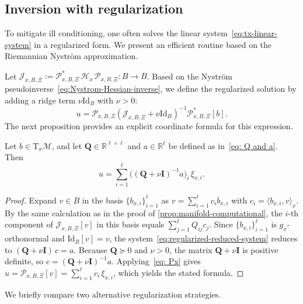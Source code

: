 \documentclass[final,onefignum,onetabnum]{siamart250211}
\begin{document}
\subsection{Inversion with regularization}
\label{subsec:regularized-riem-linear-systems}
To mitigate ill conditioning, one often solves the linear system~\eqref{eq:tx-linear-system} in a regularized form. We present an efficient routine based on the Riemannian Nystr\"om approximation.

Let $\mathcal J_{x,B,\Xi}:=\mathcal{P}_{x,B,\Xi}^{*}\,\mathcal{H}_x\,\mathcal{P}_{x,B,\Xi}:B\to B$.
Based on the Nystr\"om pseudoinverse~\eqref{eq:Nystrom-Hessian-inverse}, we define the regularized solution by adding a ridge term $\nu\mathrm{Id}_B$ with $\nu > 0$:
\begin{equation}
\label{eq:regularized-reduced-system}
u = \mathcal{P}_{x,B,\Xi} (\mathcal J_{x,B,\Xi} + \nu \mathrm{Id}_B)^{-1} \mathcal{P}_{x,B,\Xi}^{*} [b].
\end{equation}
The next proposition provides an explicit coordinate formula for this expression.

\begin{proposition}
  \label{prop:manifold-regularized-computational}
  Let $b\in \mathrm{T}_x\mathcal M$, and let $\mathbf{Q}\in\mathbb R^{\ell\times\ell}$ and $a\in\mathbb R^{\ell}$ be defined as in~\eqref{eq: Q and a}.
  Then
  \[
  u=\sum_{i=1}^{\ell}\bigl((\mathbf{Q}+\nu \mathbf{I})^{-1}a\bigr)_i\,\xi_{x,i}.
  \]
\end{proposition}

\begin{proof}
Expand $v\in B$ in the basis $\{b_{x,i}\}_{i=1}^{\ell}$ as $v=\sum_{i=1}^{\ell}c_i b_{x,i}$ with $c_i=\langle b_{x,i},v\rangle_x$.
By the same calculation as in the proof of \cref{prop:manifold-computational}, the $i$-th component of $\mathcal J_{x,B,\Xi}[v]$ in this basis equals $\sum_{j=1}^{\ell}Q_{ij}c_j$.
Since $\{b_{x,i}\}_{i=1}^{\ell}$ is $g_x$-orthonormal and $\mathrm{Id}_{B}[v]=v$, the system~\eqref{eq:regularized-reduced-system} reduces to
$
(\mathbf{Q}+\nu \mathbf{I})\,c=a.
$
Because $\mathbf{Q}\succeq 0$ and $\nu>0$, the matrix $\mathbf{Q}+\nu \mathbf{I}$ is positive definite, so $c=(\mathbf{Q}+\nu \mathbf{I})^{-1}a$.
Applying~\eqref{eq: Px} gives $u=\mathcal{P}_{x,B,\Xi}[v]=\sum_{i=1}^{\ell}c_i\,\xi_{x,i}$, which yields the stated formula.
\end{proof}

  We briefly compare two alternative regularization strategies.
  
\end{document}
